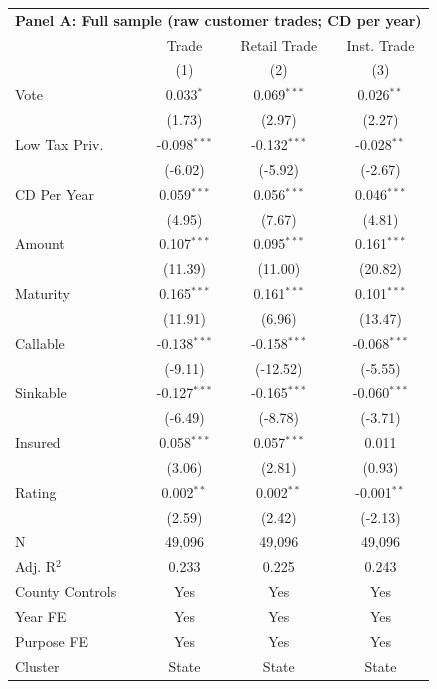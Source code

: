 \begingroup
\centering
\begin{tabular*}{\textwidth}{@{\extracolsep{\fill}}lccc}
\multicolumn{5}{l}{\textbf{Panel A: Full sample (raw customer trades; CD per year)}}\\

\addlinespace
   \toprule
                   & Trade          & Retail Trade   & Inst. Trade\\  
                   & (1)            & (2)            & (3)\\  
   \midrule 
   Vote            & 0.033$^{*}$    & 0.069$^{***}$  & 0.026$^{**}$\\   
                   & (1.73)        & (2.97)        & (2.27)\\   
   Low Tax Priv.   & -0.098$^{***}$ & -0.132$^{***}$ & -0.028$^{**}$\\   
                   & (-6.02)       & (-5.92)       & (-2.67)\\   
   CD Per Year     & 0.059$^{***}$  & 0.056$^{***}$  & 0.046$^{***}$\\   
                   & (4.95)        & (7.67)        & (4.81)\\   
   Amount          & 0.107$^{***}$  & 0.095$^{***}$  & 0.161$^{***}$\\   
                   & (11.39)       & (11.00)       & (20.82)\\   
   Maturity        & 0.165$^{***}$  & 0.161$^{***}$  & 0.101$^{***}$\\   
                   & (11.91)       & (6.96)        & (13.47)\\   
   Callable        & -0.138$^{***}$ & -0.158$^{***}$ & -0.068$^{***}$\\   
                   & (-9.11)       & (-12.52)      & (-5.55)\\   
   Sinkable        & -0.127$^{***}$ & -0.165$^{***}$ & -0.060$^{***}$\\   
                   & (-6.49)       & (-8.78)       & (-3.71)\\   
   Insured         & 0.058$^{***}$  & 0.057$^{***}$  & 0.011\\   
                   & (3.06)        & (2.81)        & (0.93)\\   
   Rating          & 0.002$^{**}$   & 0.002$^{**}$   & -0.001$^{**}$\\   
                   & (2.59)        & (2.42)        & (-2.13)\\   
   \hline
   N    & 49,096         & 49,096         & 49,096\\  
   Adj. R$^2$  & 0.233          & 0.225          & 0.243\\  
   County Controls & Yes            & Yes            & Yes\\  
   Year FE         & Yes            & Yes            & Yes\\  
   Purpose FE      & Yes            & Yes            & Yes\\  
   Cluster              & State & State & State\\  
   \bottomrule
\end{tabular*}
\par\endgroup
